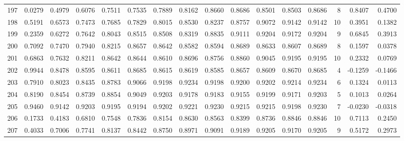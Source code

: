 \begin{tabular}{lrrrrrrrrrrrrrrr}
197 &      0.0279 &  0.4979 &  0.6076 &  0.7511 &  0.7535 &  0.7889 &  0.8162 &  0.8660 &  0.8686 &  0.8501 &   0.8503 &     0.8686 &      8 &                    0.8407 &                     0.4700 \\
198 &      0.5191 &  0.6573 &  0.7473 &  0.7685 &  0.7829 &  0.8015 &  0.8530 &  0.8237 &  0.8757 &  0.9072 &   0.9142 &     0.9142 &     10 &                    0.3951 &                     0.1382 \\
199 &      0.2359 &  0.6272 &  0.7642 &  0.8043 &  0.8515 &  0.8508 &  0.8319 &  0.8835 &  0.9111 &  0.9204 &   0.9172 &     0.9204 &      9 &                    0.6845 &                     0.3913 \\
200 &      0.7092 &  0.7470 &  0.7940 &  0.8215 &  0.8657 &  0.8642 &  0.8582 &  0.8594 &  0.8689 &  0.8633 &   0.8607 &     0.8689 &      8 &                    0.1597 &                     0.0378 \\
201 &      0.6863 &  0.7632 &  0.8211 &  0.8642 &  0.8644 &  0.8610 &  0.8696 &  0.8756 &  0.8860 &  0.9045 &   0.9195 &     0.9195 &     10 &                    0.2332 &                     0.0769 \\
202 &      0.9944 &  0.8478 &  0.8595 &  0.8611 &  0.8685 &  0.8615 &  0.8619 &  0.8585 &  0.8657 &  0.8609 &   0.8670 &     0.8685 &      4 &                   -0.1259 &                    -0.1466 \\
203 &      0.7910 &  0.8023 &  0.8435 &  0.8783 &  0.9066 &  0.9198 &  0.9234 &  0.9198 &  0.9200 &  0.9202 &   0.9214 &     0.9234 &      6 &                    0.1324 &                     0.0113 \\
204 &      0.8190 &  0.8454 &  0.8739 &  0.8854 &  0.9049 &  0.9203 &  0.9178 &  0.9183 &  0.9155 &  0.9199 &   0.9171 &     0.9203 &      5 &                    0.1013 &                     0.0264 \\
205 &      0.9460 &  0.9142 &  0.9203 &  0.9195 &  0.9194 &  0.9202 &  0.9221 &  0.9230 &  0.9215 &  0.9215 &   0.9198 &     0.9230 &      7 &                   -0.0230 &                    -0.0318 \\
206 &      0.1733 &  0.4183 &  0.6810 &  0.7548 &  0.7836 &  0.8154 &  0.8630 &  0.8563 &  0.8399 &  0.8736 &   0.8846 &     0.8846 &     10 &                    0.7113 &                     0.2450 \\
207 &      0.4033 &  0.7006 &  0.7741 &  0.8137 &  0.8442 &  0.8750 &  0.8971 &  0.9091 &  0.9189 &  0.9205 &   0.9170 &     0.9205 &      9 &                    0.5172 &                     0.2973 \\

\end{tabular}
